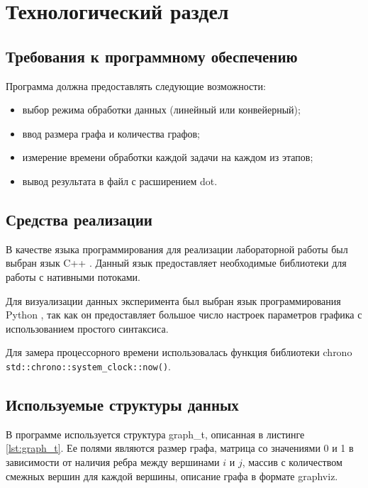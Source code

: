 \section{Технологический раздел \hfill}
\vspace{\baselineskip}

\subsection{Требования к программному обеспечению}

Программа должна предоставлять следующие возможности:
\begin{itemize}[label=---]
    \item выбор режима обработки данных (линейный или конвейерный);
    \item ввод размера графа и количества графов;
    \item измерение времени обработки каждой задачи на каждом из этапов;
    \item вывод результата в файл с расширением dot.
\end{itemize}

\subsection{Средства реализации}

В качестве языка программирования для реализации лабораторной работы был выбран язык C++ \cite{cpp}. Данный язык предоставляет необходимые библиотеки для работы с нативными потоками. 

Для визуализации данных эксперимента был выбран язык программирования Python \cite{python}, так как он предоставляет большое число настроек параметров графика с использованием простого синтаксиса. 

Для замера процессорного времени использовалась функция библиотеки chrono \cite{chrono} \texttt{std::chrono::system\_clock::now()}.

\subsection{Используемые структуры данных}

В программе используется структура graph\_t, описанная в листинге \ref{lst:graph_t}. Ее полями являются размер графа, матрица со значениями 0 и 1 в зависимости от наличия ребра между вершинами $i$ и $j$, массив с количеством смежных вершин для каждой вершины, описание графа в формате graphviz.

